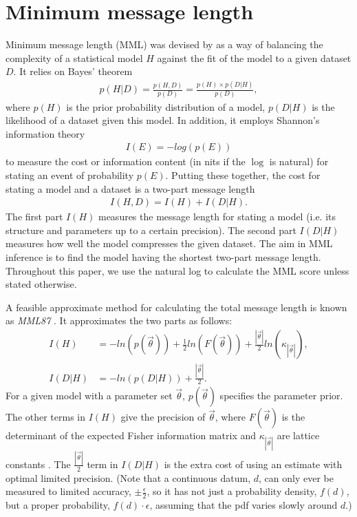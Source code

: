 \section{Minimum message length} 
\label{sec:mml}
Minimum message length (MML) was devised by \cite{wallace1968} as a way of balancing the complexity of a statistical model $H$ against the fit of the model to a given dataset $D$.  It relies on Bayes' theorem 
\begin{align*}
p(H|D) = \frac{p(H, D)}{p(D)} = \frac{p(H) \times p(D|H)}{p(D)},
\end{align*}
where $p(H)$ is the prior probability distribution of a model, $p(D|H)$ is the likelihood of a dataset given this model. In addition, it employs Shannon's information theory  
\begin{align*}
I(E) = -log(p(E))
\end{align*}
to measure the cost or information content (in nits if the $\log$ is natural) for stating an event of probability $p(E)$. Putting these together, the cost for stating a model and a dataset is a two-part message length
\begin{align}
\label{eq:mml}
I(H, D) = I(H) + I(D|H).
\end{align}
The first part $I(H)$ measures the message length for stating a model (i.e. its structure and parameters up to a certain precision). The second part $I(D|H)$ measures how well the model compresses the given dataset. The aim in MML inference is to find the model having the shortest two-part message length. Throughout this paper, we use the natural log to calculate the MML score unless stated otherwise. 

A feasible approximate method for calculating the total message length is known as \textit{MML87} \cite{wallace1987}. It approximates the two parts as follows:
\begin{align}
\label{eq:mml_1}
I(H) &= -ln(p(\vec{\theta})) + \frac{1}{2} ln(F(\vec{\theta})) + \frac{|\vec{\theta}|}{2} ln(\kappa_{|\vec{\theta}|}), \\
\label{eq:mml_2}
I(D|H) &= -ln(p(D|H)) + \frac{|\vec{\theta}|}{2}.
\end{align}
For a given model with a parameter set $\vec{\theta}$, $p(\vec{\theta})$ specifies the parameter prior. The other terms in $I(H)$ give the precision of $\vec{\theta}$, where $F(\vec{\theta})$ is the determinant of the expected Fisher information matrix and $\kappa_{|\vec{\theta}|}$ are lattice constants \cite{wallace2005}. The $\frac{|\vec{\theta}|}{2}$ term in $I(D|H)$ is the extra cost of using an estimate with optimal limited precision. (Note that a continuous datum, $d$, can only ever be measured to limited accuracy, $\pm \frac{\epsilon}{2}$, so it has not just a probability density, $f(d)$, but a proper probability, $f(d)\cdot \epsilon$, assuming that the pdf varies slowly around $d$.)

